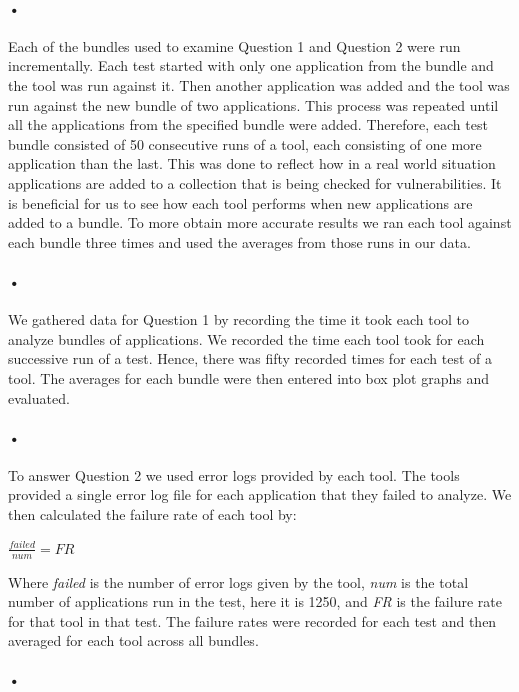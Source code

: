 \documentclass[twocolumn]{article}
\begin{document}
\paragraph{•}
	Each of the bundles used to examine Question 1 and Question 2 were run incrementally. Each test started with only one application from the bundle and the tool was run against it. Then another application was added and the tool was run against the new bundle of two applications. This process was repeated until all the applications from the specified bundle were added. Therefore, each test bundle consisted of 50 consecutive runs of a tool, each consisting of one more application than the last. This was done to reflect how in a real world situation applications are added to a collection that is being checked for vulnerabilities. It is beneficial for us to see how each tool performs when new applications are added to a bundle. To more obtain more accurate results we ran each tool against each bundle three times and used the averages from those runs in our data.
\paragraph{•}
	We gathered data for Question 1 by recording the time it took each tool to analyze bundles of applications. We recorded the time each tool took for each successive run of a test. Hence, there was fifty recorded times for each test of a tool. The averages for each bundle were then entered into box plot graphs and evaluated.
\paragraph{•}
	To answer Question 2 we used error logs provided by each tool. The tools provided a single error log file for each application that they failed to analyze. We then calculated the failure rate of each tool by:\\
	\begin{center}
		\(\frac{failed}{num}=FR\)
	\end{center}
	Where \textit{failed} is the number of error logs given by the tool, \textit{num} is the total number of applications run in the test, here it is 1250, and \textit{FR} is the failure rate for that tool in that test. The failure rates were recorded for each test and then averaged for each tool across all bundles.
\paragraph{•}
	
\end{document}
